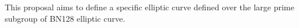 This proposal aims to define a specific elliptic curve defined over the large prime subgroup of BN128 elliptic curve.
